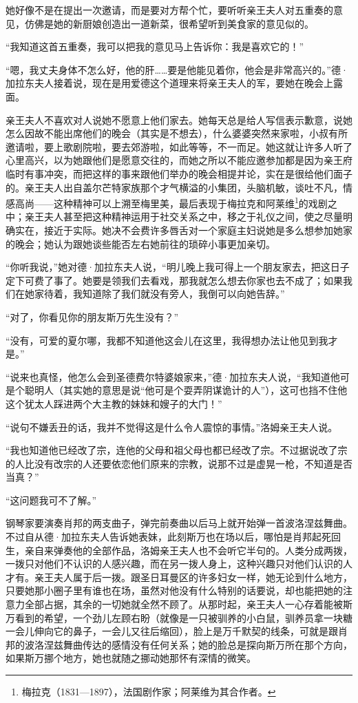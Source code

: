 \par 她好像不是在提出一次邀请，而是要对方帮个忙，要听听亲王夫人对五重奏的意见，仿佛是她的新厨娘创造出一道新菜，很希望听到美食家的意见似的。
\par “我知道这首五重奏，我可以把我的意见马上告诉你：我是喜欢它的！”
\par “嗯，我丈夫身体不怎么好，他的肝……要是他能见着你，他会是非常高兴的。”德·加拉东夫人接着说，现在是用爱德这个道理来将亲王夫人的军，要她在晚会上露面。
\par 亲王夫人不喜欢对人说她不愿意上他们家去。她每天总是给人写信表示歉意，说她怎么因故不能出席他们的晚会（其实是不想去），什么婆婆突然来家啦，小叔有所邀请啦，要上歌剧院啦，要去郊游啦，如此等等，不一而足。她这就让许多人听了心里高兴，以为她跟他们是愿意交往的，而她之所以不能应邀参加都是因为亲王府临时有事冲突，而把这样的事来跟他们举办的晚会相提并论，实在是很给他们面子的。亲王夫人出自盖尔芒特家族那个才气横溢的小集团，头脑机敏，谈吐不凡，情感高尚——这种精神可以上溯至梅里美，最后表现于梅拉克和阿莱维\footnote{梅拉克（1831—1897），法国剧作家；阿莱维为其合作者。}的戏剧之中；亲王夫人甚至把这种精神运用于社交关系之中，移之于礼仪之间，使之尽量明确实在，接近于实际。她决不会费许多唇舌对一个家庭主妇说她是多么想参加她家的晚会；她认为跟她谈些能否左右她前往的琐碎小事更加亲切。
\par “你听我说，”她对德·加拉东夫人说，“明儿晚上我可得上一个朋友家去，把这日子定下可费了事了。她要是领我们去看戏，那我就怎么想去你家也去不成了；如果我们在她家待着，我知道除了我们就没有旁人，我倒可以向她告辞。”
\par “对了，你看见你的朋友斯万先生没有？”
\par “没有，可爱的夏尔哪，我都不知道他这会儿在这里，我得想办法让他见到我才是。”
\par “说来也真怪，他怎么会到圣德费尔特婆娘家来，”德·加拉东夫人说，“我知道他可是个聪明人（其实她的意思是说“他可是个耍弄阴谋诡计的人”），这可也挡不住他这个犹太人踩进两个大主教的妹妹和嫂子的大门！”
\par “说句不嫌丢丑的话，我并不觉得这是什么令人震惊的事情。”洛姆亲王夫人说。
\par “我也知道他已经改了宗，连他的父母和祖父母也都已经改了宗。不过据说改了宗的人比没有改宗的人还要依恋他们原来的宗教，说那不过是虚晃一枪，不知道是否当真？”
\par “这问题我可不了解。”
\par 钢琴家要演奏肖邦的两支曲子，弹完前奏曲以后马上就开始弹一首波洛涅兹舞曲。不过自从德·加拉东夫人告诉她表妹，此刻斯万也在场以后，哪怕是肖邦起死回生，亲自来弹奏他的全部作品，洛姆亲王夫人也不会听它半句的。人类分成两拨，一拨只对他们不认识的人感兴趣，而在另一拨人身上，这种兴趣只对他们认识的人才有。亲王夫人属于后一拨。跟圣日耳曼区的许多妇女一样，她无论到什么地方，只要她那小圈子里有谁也在场，虽然对他没有什么特别的话要说，却也能把她的注意力全部占据，其余的一切她就全然不顾了。从那时起，亲王夫人一心存着能被斯万看到的希望，一个劲儿左顾右盼（就像是一只被驯养的小白鼠，驯养员拿一块糖一会儿伸向它的鼻子，一会儿又往后缩回），脸上是万千默契的线条，可就是跟肖邦的波洛涅兹舞曲传达的感情没有任何关系；她的脸总是探向斯万所在那个方向，如果斯万挪个地方，她也就随之挪动她那怀有深情的微笑。
